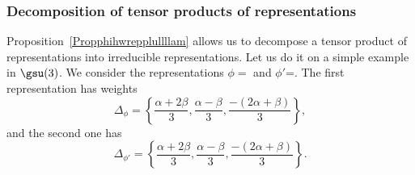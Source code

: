 %

                    \subsubsection{Decomposition of tensor products of representations}


%

%

%


Proposition~\ref{Propphihwrepplullllam} allows us to decompose a tensor product of representations into irreducible representations. Let us do it on a simple example in $\gsu(3)$. We consider the representations $\phi=$ and $\phi'$=. The first representation has weights
\begin{equation}
    \Delta_{\phi}=\left\{ \frac{ \alpha+2\beta }{ 3 },\frac{ \alpha-\beta }{ 3 },\frac{ -(2\alpha+\beta) }{ 3 } \right\},
\end{equation}
and the second one has
\begin{equation}
    \Delta_{\phi'}=\left\{ \frac{ \alpha+2\beta }{ 3 },\frac{ \alpha-\beta }{ 3 },\frac{ -(2\alpha+\beta) }{ 3 } \right\}.
\end{equation}

